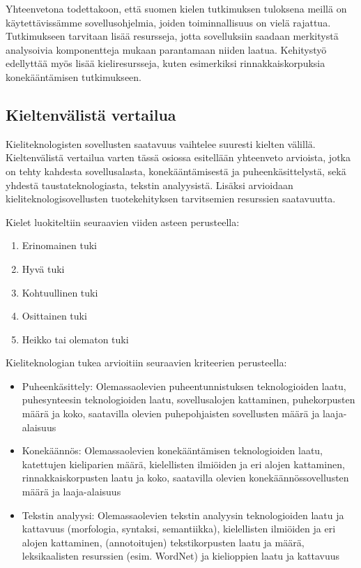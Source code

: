 \begin{multicols}{2}
Yhteenvetona todettakoon, että suomen kielen tutkimuksen tuloksena
meillä on käytettävissämme sovellusohjelmia, joiden toiminnallisuus on
vielä rajattua.  Tutkimukseen tarvitaan lisää resursseja, jotta
sovelluksiin saadaan merkitystä analysoivia komponentteja mukaan
parantamaan niiden laatua. Kehitystyö edellyttää myös lisää
kieliresursseja, kuten esimerkiksi rinnakkaiskorpuksia konekääntämisen
tutkimukseen.

\subsection{Kieltenvälistä vertailua}

Kieliteknologisten sovellusten saatavuus vaihtelee suuresti kielten välillä.  Kieltenvälistä vertailua varten tässä osiossa esitellään yhteenveto arvioista, jotka on tehty kahdesta sovellusalasta, konekääntämisestä ja puheenkäsittelystä, sekä yhdestä taustateknologiasta, tekstin analyysistä. Lisäksi arvioidaan kieliteknologisovellusten tuotekehityksen tarvitsemien resurssien saatavuutta.

Kielet luokiteltiin seuraavien viiden asteen perusteella:

\begin{enumerate}
\item Erinomainen tuki
\item Hyvä tuki
\item Kohtuullinen tuki
\item Osittainen tuki
\item Heikko tai olematon tuki
\end{enumerate}

Kieliteknologian tukea arvioitiin seuraavien kriteerien
perusteella:

\begin{itemize}
\item Puheenkäsittely: Olemassaolevien puheentunnistuksen teknologioiden
laatu, puhesynteesin teknologioiden laatu, sovellusalojen kattaminen,
puhekorpusten määrä ja koko, saatavilla olevien puhepohjaisten
sovellusten määrä ja laaja-alaisuus

\item Konekäännös: Olemassaolevien konekääntämisen teknologioiden
laatu, katettujen kieliparien määrä, kielellisten ilmiöiden ja
eri alojen kattaminen, rinnakkaiskorpusten laatu ja koko,
saatavilla olevien konekäännössovellusten määrä ja laaja-alaisuus

\item Tekstin analyysi: Olemassaolevien tekstin
analyysin teknologioiden laatu ja kattavuus (morfologia, syntaksi,
semantiikka), kielellisten ilmiöiden ja eri alojen kattaminen,
(annotoitujen) tekstikorpusten laatu ja määrä, leksikaalisten resurssien
(esim. WordNet) ja kielioppien laatu ja kattavuus


\end{itemize}
\end{multicols}
